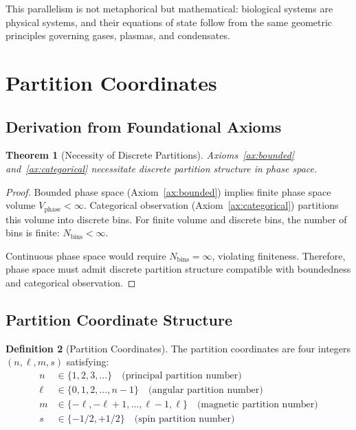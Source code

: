 \documentclass[11pt,twocolumn,a4paper]{article}
\newtheorem{theorem}{Theorem}[section]
\theoremstyle{definition}
\newtheorem{definition}[theorem]{Definition}
\theoremstyle{remark}
\begin{document}
This parallelism is not metaphorical but mathematical: biological systems are physical systems, and their equations of state follow from the same geometric principles governing gases, plasmas, and condensates.

\section{Partition Coordinates}
\label{sec:partition_coordinates}

\subsection{Derivation from Foundational Axioms}

\begin{theorem}[Necessity of Discrete Partitions]
\label{thm:discrete_partitions}
Axioms~\ref{ax:bounded} and~\ref{ax:categorical} necessitate discrete partition structure in phase space.
\end{theorem}

\begin{proof}
Bounded phase space (Axiom~\ref{ax:bounded}) implies finite phase space volume $V_{\mathrm{phase}} < \infty$. Categorical observation (Axiom~\ref{ax:categorical}) partitions this volume into discrete bins. For finite volume and discrete bins, the number of bins is finite: $N_{\mathrm{bins}} < \infty$.

Continuous phase space would require $N_{\mathrm{bins}} = \infty$, violating finiteness. Therefore, phase space must admit discrete partition structure compatible with boundedness and categorical observation.
\end{proof}

\subsection{Partition Coordinate Structure}

\begin{definition}[Partition Coordinates]
\label{def:partition_coordinates}
The partition coordinates are four integers $(n,\ell,m,s)$ satisfying:
\begin{align}
n &\in \{1,2,3,\ldots\} \quad \text{(principal partition number)} \label{eq:n} \\
\ell &\in \{0,1,2,\ldots,n-1\} \quad \text{(angular partition number)} \label{eq:ell} \\
m &\in \{-\ell,-\ell+1,\ldots,\ell-1,\ell\} \quad \text{(magnetic partition number)} \label{eq:m} \\
s &\in \{-1/2, +1/2\} \quad \text{(spin partition number)} \label{eq:s}
\end{align}
\end{definition}
\end{document}
